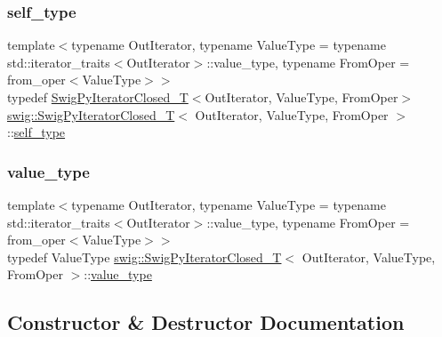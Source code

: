 \subsubsection{\texorpdfstring{self\+\_\+type}{self\_type}}
{\footnotesize\ttfamily template$<$typename Out\+Iterator, typename Value\+Type = typename std\+::iterator\+\_\+traits$<$\+Out\+Iterator$>$\+::value\+\_\+type, typename From\+Oper = from\+\_\+oper$<$\+Value\+Type$>$$>$ \\
typedef \hyperlink{classswig_1_1_swig_py_iterator_closed___t}{Swig\+Py\+Iterator\+Closed\+\_\+T}$<$Out\+Iterator, Value\+Type, From\+Oper$>$ \hyperlink{classswig_1_1_swig_py_iterator_closed___t}{swig\+::\+Swig\+Py\+Iterator\+Closed\+\_\+T}$<$ Out\+Iterator, Value\+Type, From\+Oper $>$\+::\hyperlink{classswig_1_1_swig_py_iterator___t_af10eb8078eb41f1dbca3701f27bd8e73}{self\+\_\+type}}

\mbox{\label{classswig_1_1_swig_py_iterator_closed___t_adff468d976862d52fa259857d5a30dba}} 
\subsubsection{\texorpdfstring{value\+\_\+type}{value\_type}}
{\footnotesize\ttfamily template$<$typename Out\+Iterator, typename Value\+Type = typename std\+::iterator\+\_\+traits$<$\+Out\+Iterator$>$\+::value\+\_\+type, typename From\+Oper = from\+\_\+oper$<$\+Value\+Type$>$$>$ \\
typedef Value\+Type \hyperlink{classswig_1_1_swig_py_iterator_closed___t}{swig\+::\+Swig\+Py\+Iterator\+Closed\+\_\+T}$<$ Out\+Iterator, Value\+Type, From\+Oper $>$\+::\hyperlink{classswig_1_1_swig_py_iterator___t_a1441e2409c41706ad7aee977165f675e}{value\+\_\+type}}



\subsection{Constructor \& Destructor Documentation}
\mbox{\label{classswig_1_1_swig_py_iterator_closed___t_ae23b1da812fe9a789dcbc18b4db5ffe9}} 
